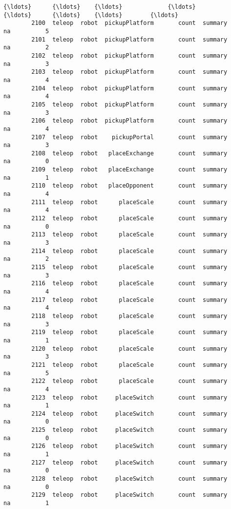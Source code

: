\documentclass[11pt]{article}
\begin{document}
\begin{Verbatim}[commandchars=\\\{\}]
        {\ldots}      {\ldots}    {\ldots}             {\ldots}         {\ldots}      {\ldots}    {\ldots}        {\ldots}   
        2100  teleop  robot  pickupPlatform       count  summary     na          5   
        2101  teleop  robot  pickupPlatform       count  summary     na          2   
        2102  teleop  robot  pickupPlatform       count  summary     na          3   
        2103  teleop  robot  pickupPlatform       count  summary     na          4   
        2104  teleop  robot  pickupPlatform       count  summary     na          4   
        2105  teleop  robot  pickupPlatform       count  summary     na          3   
        2106  teleop  robot  pickupPlatform       count  summary     na          4   
        2107  teleop  robot    pickupPortal       count  summary     na          3   
        2108  teleop  robot   placeExchange       count  summary     na          0   
        2109  teleop  robot   placeExchange       count  summary     na          1   
        2110  teleop  robot   placeOpponent       count  summary     na          4   
        2111  teleop  robot      placeScale       count  summary     na          4   
        2112  teleop  robot      placeScale       count  summary     na          0   
        2113  teleop  robot      placeScale       count  summary     na          3   
        2114  teleop  robot      placeScale       count  summary     na          2   
        2115  teleop  robot      placeScale       count  summary     na          3   
        2116  teleop  robot      placeScale       count  summary     na          4   
        2117  teleop  robot      placeScale       count  summary     na          4   
        2118  teleop  robot      placeScale       count  summary     na          3   
        2119  teleop  robot      placeScale       count  summary     na          1   
        2120  teleop  robot      placeScale       count  summary     na          3   
        2121  teleop  robot      placeScale       count  summary     na          5   
        2122  teleop  robot      placeScale       count  summary     na          4   
        2123  teleop  robot     placeSwitch       count  summary     na          1   
        2124  teleop  robot     placeSwitch       count  summary     na          0   
        2125  teleop  robot     placeSwitch       count  summary     na          0   
        2126  teleop  robot     placeSwitch       count  summary     na          1   
        2127  teleop  robot     placeSwitch       count  summary     na          0   
        2128  teleop  robot     placeSwitch       count  summary     na          0   
        2129  teleop  robot     placeSwitch       count  summary     na          1   
        

\end{Verbatim}
\end{document}
